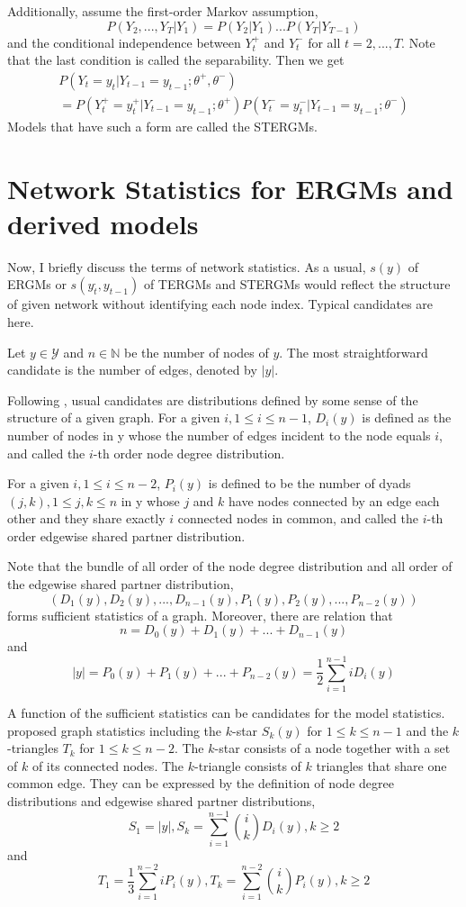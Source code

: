 \documentclass[a4paper, 11pt]{report}
\theoremstyle{definition}
\begin{document}
Additionally, assume the first-order Markov assumption,
\[P(Y_2,...,Y_T|Y_1)=P(Y_2|Y_1)...P(Y_T|Y_{T-1})\]
and the conditional independence between $Y_t^+$ and $Y_t^-$ for all $t=2,...,T$.
Note that the last condition is called the separability.
Then we get
\begin{multline}
    P(Y_t=y_t|Y_{t-1}=y_{t-1};\theta^+,\theta^-) \\
    = P(Y_t^+=y_t^+|Y_{t-1}=y_{t-1};\theta^+) P(Y_t^-=y_t^-|Y_{t-1}=y_{t-1};\theta^-)
\end{multline}
Models that have such a form are called the STERGMs.



\section{Network Statistics for ERGMs and derived models}
Now, I briefly discuss the terms of network statistics.
As a usual, $s(y)$ of ERGMs or $s(y_{t}^.,y_{t-1})$ of TERGMs and STERGMs would 
reflect the structure of given network without identifying each node index.
Typical candidates are here.


Let $y\in\mathcal{Y}$ and $n\in\mathbb{N}$ be the number of nodes of $y$.
The most straightforward candidate is the number of edges, denoted by $|y|$.

Following \cite{RN104}, usual candidates are distributions defined by some sense of the structure of a given graph. 
For a given $i, 1\leq i \leq n-1$, $D_i(y)$ is defined as the number of nodes in y whose the number of edges incident to the node equals $i$, 
and called the $i$-th order node degree distribution. 

For a given $i, 1\leq i \leq n-2$, $P_i(y)$ is defined to be the number of dyads $(j,k), 1\leq j,k \leq n$
in y whose $j$ and $k$ have nodes connected by an edge each other and they share exactly $i$ connected nodes in common,
and called the $i$-th order edgewise shared partner distribution.

Note that the bundle of all order of the node degree distribution and all order of the edgewise shared partner distribution,
\[(D_1(y),D_2(y),...,D_{n-1}(y),P_1(y),P_2(y),...,P_{n-2}(y))\] 
forms sufficient statistics of a graph.
Moreover, there are relation that
\[n=D_0(y)+D_1(y)+...+D_{n-1}(y)\]
and
\[|y|=P_0(y)+P_1(y)+...+P_{n-2}(y)=\frac{1}{2}\sum_{i=1}^{n-1} iD_i(y)\]


A function of the sufficient statistics can be candidates for the model statistics.
\cite{RN128} proposed graph statistics including the $k$-star $S_k(y)$ for $1\leq k \leq n-1$ and the $k$-triangles $T_k$ for $1\leq k \leq n-2$.
The $k$-star consists of a node together with a set of $k$ of its connected nodes.
The $k$-triangle consists of $k$ triangles that share one common edge.
They can be expressed by the definition of node degree distributions and edgewise shared partner distributions,
\[S_1 = |y|, 
S_k = \sum_{i=1}^{n-1} \binom{i}{k} D_i(y), k\geq 2\]
and
\[T_1 = \frac{1}{3}\sum_{i=1}^{n-2} iP_i(y),
T_k = \sum_{i=1}^{n-2} \binom{i}{k} P_i(y), k\geq 2\]
\end{document}
